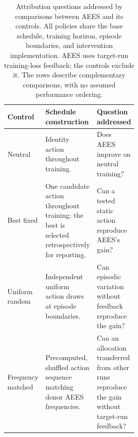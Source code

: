 \begin{table}[t]
\centering
\caption{Attribution questions addressed by comparisons between AEES and its
controls. All policies share the base schedule, training horizon, episode
boundaries, and intervention implementation. AEES uses target-run
training-loss feedback; the controls exclude it. The rows describe
complementary comparisons, with no assumed performance ordering.}
\label{tab:audit-controls}
\small
\setlength{\tabcolsep}{3pt}
\renewcommand{\arraystretch}{1.08}
\begin{tabularx}{\linewidth}{@{}>{\raggedright\arraybackslash}p{0.19\linewidth}
>{\raggedright\arraybackslash}p{0.33\linewidth}
>{\raggedright\arraybackslash}X@{}}
\toprule
Control & Schedule construction & Question addressed \\
\midrule
Neutral & Identity action throughout training.
& Does AEES improve on neutral training? \\
\addlinespace[3pt]
Best fixed & One candidate action throughout training; the best is selected
retrospectively for reporting.
& Can a tested static action reproduce AEES's gain? \\
\addlinespace[3pt]
Uniform random & Independent uniform action draws at episode boundaries.
& Can episodic variation without feedback reproduce the gain? \\
\addlinespace[3pt]
Frequency matched & Precomputed, shuffled action sequence matching donor AEES
frequencies.
& Can an allocation transferred from other runs reproduce the gain without
target-run feedback? \\
\bottomrule
\end{tabularx}
\end{table}
